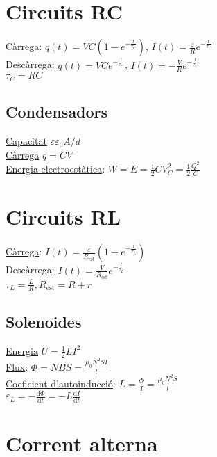 \documentclass[12pt]{article}
\begin{document}
\raggedright
\begin{multicols}{5}

\section{Circuits RC}

\underline{Càrrega}: $q(t) = VC\left( 1 - e^{-\frac{t}{\tau_C}}\right)$, $I(t) = \frac{\varepsilon}{R} e^{-\frac{t}{\tau_C}}$ \\
\underline{Descàrrega}: $q(t) = VCe^{-\frac{t}{\tau_C}}$, $I(t) = -\frac{V}{R}e^{-\frac{t}{\tau_C}}$ \\

$\tau_C = RC$
\subsection{Condensadors}

\underline{Capacitat} $\varepsilon \varepsilon_0 A / d$ \\
\underline{Càrrega} $q = CV$ \\
\underline{Energia electroestàtica}: $W = E = \frac{1}{2}CV_C^2 = \frac{1}{2}\frac{Q^2}{C}$

\section{Circuits RL}
\underline{Càrrega}: $I(t) = \frac{\varepsilon}{R_{\text{est}}} \left(1 - e^{-\frac{t}{\tau_L}}\right)$ \\
\underline{Descàrrega}: $I(t) = \frac{V}{R_{\text{est}}}e^{-\frac{t}{\tau_L}}$ \\
$\tau_L = \frac{L}{R}, R_{\text{est}} = R + r$

\subsection{Solenoides}

\underline{Energia} $U = \frac{1}{2} L I^2$ \\ 
\underline{Flux}: $\Phi = NBS = \frac{\mu_0 N^2SI}{l}$ \\
\underline{Coeficient d'autoinducció}: $L = \frac{\Phi}{I} = \frac{\mu_0N^2S}{l}$ \\
$\varepsilon_L= -\frac{\text{d}\Phi}{\text{d}t} = -L \frac{\text{d}I}{\text{d}t}$

\section{Corrent alterna}


\end{multicols}
\end{document}
